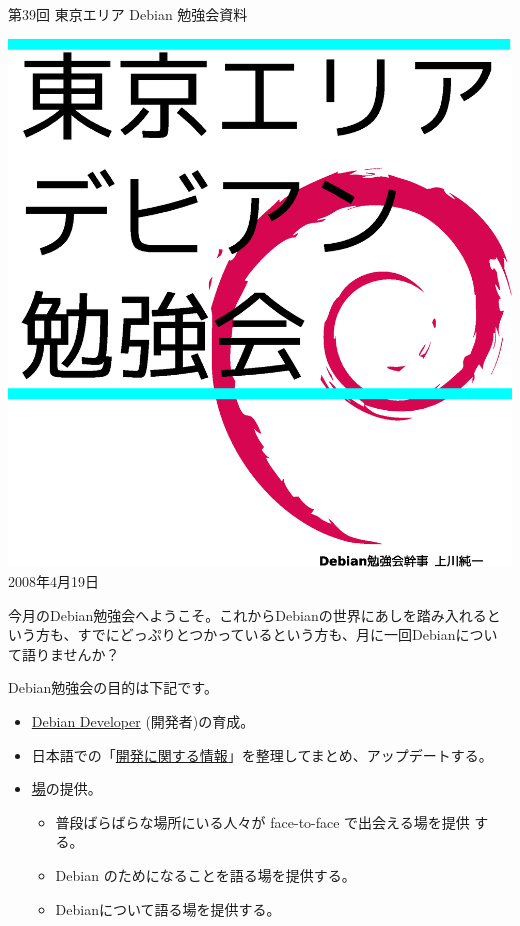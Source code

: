 \documentclass[mingoth,a4paper]{jsarticle}
\newcommand{\debmtgyear}{2008}
\newcommand{\debmtgmonth}{4}
\newcommand{\debmtgdate}{19}
\newcommand{\debmtgnumber}{39}
\begin{document}
\begin{titlepage}
\thispagestyle{empty}


\vspace*{-2cm}
第\debmtgnumber{}回 東京エリア Debian 勉強会資料

\hspace*{-2.4cm}
\includegraphics[width=210mm]{image200801/2008title.eps}\\
\hfill{}\debmtgyear{}年\debmtgmonth{}月\debmtgdate{}日

\end{titlepage}

 
 今月のDebian勉強会へようこそ。これからDebianの世界にあしを踏み入れると
 いう方も、すでにどっぷりとつかっているという方も、月に一回Debianについ
 て語りませんか？

 Debian勉強会の目的は下記です。

\begin{itemize}
 \item \underline{Debian Developer} (開発者)の育成。
 \item 日本語での「\underline{開発に関する情報}」を整理してまとめ、アップデートする。
 \item \underline{場}の提供。
 \begin{itemize}
  \item 普段ばらばらな場所にいる人々が face-to-face で出会える場を提供
	する。
  \item Debian のためになることを語る場を提供する。
  \item Debianについて語る場を提供する。
 \end{itemize}
\end{itemize}		
\end{document}
